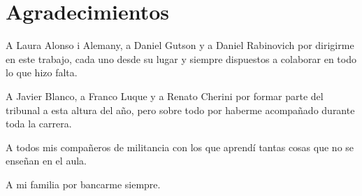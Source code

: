 \chapter*{Agradecimientos}
A Laura Alonso i Alemany, a Daniel Gutson y a Daniel Rabinovich por dirigirme en
este trabajo, cada uno desde su lugar y siempre dispuestos a colaborar en todo
lo que hizo falta. 

A Javier Blanco, a Franco Luque y a Renato Cherini por formar parte del tribunal
a esta altura del a\~no, pero sobre todo por haberme acompa\~nado durante toda
la carrera. 

A todos mis compa\~neros de militancia con los que aprend\'i tantas cosas que no
se ense\~nan en el aula. 

A mi familia por bancarme siempre.